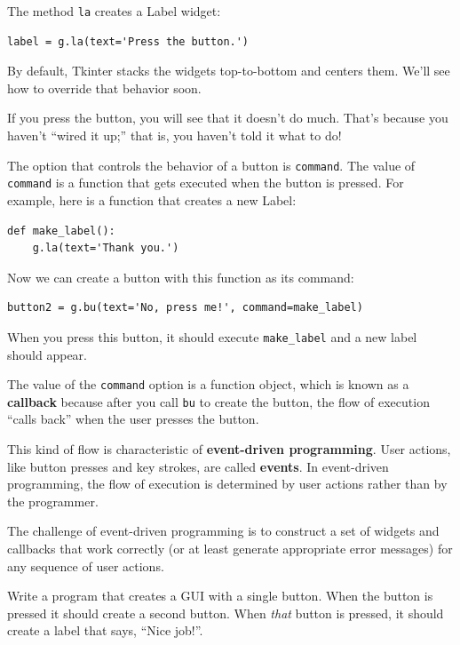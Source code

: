 \documentclass[10pt]{book}
\begin{document}
\begin{CJK}{UTF8}{gbsn}
The method {\tt la} creates a Label widget:

\begin{verbatim}
label = g.la(text='Press the button.')
\end{verbatim}
%
By default, Tkinter stacks the widgets top-to-bottom and centers
them.  We'll see how to override that behavior soon.

If you press the button, you will see that it doesn't do much.
That's because you haven't ``wired it up;'' that is, you haven't
told it what to do!

The option that controls the behavior of a button is {\tt command}.
The value of {\tt command} is a function that gets executed when
the button is pressed.  For example, here is a function that creates
a new Label:

\begin{verbatim}
def make_label():
    g.la(text='Thank you.')
\end{verbatim}
%
Now we can create a button with this function as its command:

\begin{verbatim}
button2 = g.bu(text='No, press me!', command=make_label)
\end{verbatim}
%
When you press this button, it should execute \verb"make_label"
and a new label should appear.

The value of the {\tt command} option
is a function object, which is known as a {\bf callback} because
after you call {\tt bu} to create the button, the flow of execution
``calls back'' when the user presses the button.

This kind of flow is characteristic of {\bf event-driven programming}.
User actions, like button presses and key strokes, are called {\bf
events}.  In event-driven programming, the flow of execution is
determined by user actions rather than by the programmer.  

The challenge of event-driven programming is to construct a set of
widgets and callbacks that work correctly (or at least generate
appropriate error messages) for any sequence of user actions.

\begin{exercise}

Write a program that creates a GUI with a single button.  When the
button is pressed it should create a second button.  When
{\em that} button is pressed, it should create a label that
says, ``Nice job!''.


\end{exercise}
\end{CJK}
\end{document}
